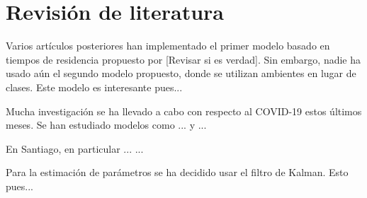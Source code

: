 \section{Revisión de literatura} \label{sec:literatura} 





Varios artículos posteriores han implementado el primer modelo basado en tiempos de residencia propuesto por \cite{Bichara2015} [Revisar si es verdad]. Sin embargo, nadie ha usado aún el segundo modelo propuesto, donde se utilizan ambientes en lugar de clases. Este modelo es interesante pues... 




Mucha investigación se ha llevado a cabo con respecto al COVID-19 estos últimos meses. Se han estudiado modelos como ... y ... 

En Santiago, en particular ... ... 



Para la estimación de parámetros se ha decidido usar el filtro de Kalman. Esto pues... %

